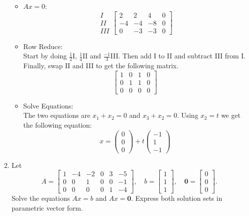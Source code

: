 \documentclass[12pt,a4paper]{exam}
\begin{document}
\begin{enumerate}
\begin{solution}
\begin{itemize}
            
        \item $Ax=0$:\\
            \[ \begin{matrix}
                I\\II\\III
            \end{matrix} \left[ \begin{array}{cccc}
            2 & 2 & 4 & 0 \\
            -4 & -4 & -8 & 0 \\
            0 & -3 & -3 & 0
            \end{array} \right] \]
        \item Row Reduce:\\
            Start by doing $\frac{1}{2}$I, $\frac{1}{4}$II and $\frac{-1}{3}$III. Then add I to II and subtract III from I. Finally, swap II and III to get the following matrix.
            \[ \left[ \begin{array}{cccc}
            1 & 0 & 1 & 0 \\
            0 & 1 & 1 & 0 \\
            0 & 0 & 0 & 0 
            \end{array} \right] \]
        \item Solve Equations:\\
            The two equations are $x_1+x_2=0$ and $x_3+x_2=0$. Using $x_2=t$ we get the following equation:
            $$x=\left(\begin{matrix}
                0\\0\\0
            \end{matrix} \right) + 
            t\left(\begin{matrix}
                -1\\1\\-1
            \end{matrix} \right)$$
    \end{itemize}
\end{solution}



\item \cite[cf. Section 1.5, Ex 11]{La-LA}
Let
\[
A=\left[\begin{matrix} 1 & -4 & -2 & 0 & 3 & -5 \\ 0 & 0 & 1 & 0 & 0 & -1 \\ 0 & 0 & 0 & 0 & 1 & -4
\end{matrix}\right], \quad
b=\left[\begin{matrix} 1 \\ 1 \\ 1 \end{matrix}\right], \quad
\mathbf{0}=\left[\begin{matrix} 0 \\ 0 \\ 0 \end{matrix}\right].
\]
Solve the equations $Ax=b$ and  $Ax=\mathbf{0}$. Express both solution sets in parametric vector form.


\end{enumerate}
\end{document}
